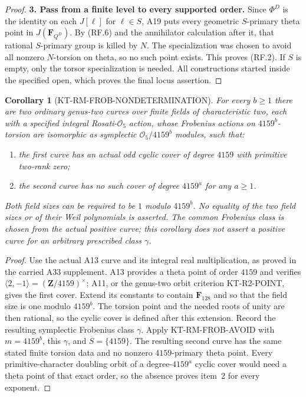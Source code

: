 \documentclass[11pt,a4paper]{article}
\newtheorem{corollary}[theorem]{Corollary}
\theoremstyle{definition}
\renewcommand{\paragraph}[1]{\par\smallskip\noindent\textbf{#1}\quad\ignorespaces}
\begin{document}
\begin{proof}
\paragraph{3. Pass from a finite level to every supported order.}
Since $\Phi^D$ is the identity on each $J[\ell]$ for
$\ell\in S$, A19 puts every geometric $S$-primary theta point
in $J(\mathbf F_{Q^D})$.  By (RF.6) and the annihilator
calculation after it, that rational $S$-primary group is killed
by $N$.  The specialization was chosen to avoid all nonzero
$N$-torsion on theta, so no such point exists.  This proves
(RF.2).  If $S$ is empty, only the torsor specialization is
needed.  All constructions started inside the specified open,
which proves the final locus assertion.
\end{proof}

\begin{corollary}[KT-RM-FROB-NONDETERMINATION]
For every $b\geq1$ there are two ordinary genus-two curves over
finite fields of characteristic two, each with a specified
integral Rosati-$\mathcal O_5$ action, whose Frobenius actions
on $4159^b$-torsion are isomorphic as symplectic
$\mathcal O_5/4159^b$ modules, such that:
\begin{enumerate}
\item the first curve has an actual odd cyclic cover of degree
      $4159$ with primitive two-rank zero;
\item the second curve has no such cover of degree $4159^a$
      for \emph{any} $a\geq1$.
\end{enumerate}
Both field sizes can be required to be $1$ modulo $4159^b$.
No equality of the two field sizes or of their Weil polynomials
is asserted.  The common Frobenius class is chosen from the
actual positive curve; this corollary does not assert a positive
curve for an arbitrary prescribed class $\gamma$.
\end{corollary}
\begin{proof}
Use the actual A13 curve and its integral real multiplication,
as proved in the carried A33 supplement.  A13 provides a theta
point of order $4159$ and verifies
$\langle2,-1\rangle=(\mathbf Z/4159)^\times$; A11, or the
genus-two orbit criterion KT-R2-POINT, gives the first cover.
Extend its constants to contain $\mathbf F_{128}$ and so
that the field size is one modulo $4159^b$.  The torsion
point and the needed roots of unity are then rational, so
the cyclic cover is defined after this extension.  Record
the resulting symplectic Frobenius class $\gamma$.
Apply KT-RM-FROB-AVOID with $m=4159^b$, this $\gamma$, and
$S=\{4159\}$.  The resulting second curve has the same stated
finite torsion data and no nonzero $4159$-primary theta point.
Every primitive-character doubling orbit of a degree-$4159^a$
cyclic cover would need a theta point of that exact order, so
the absence proves item~2 for every exponent.
\end{proof}
\end{document}
